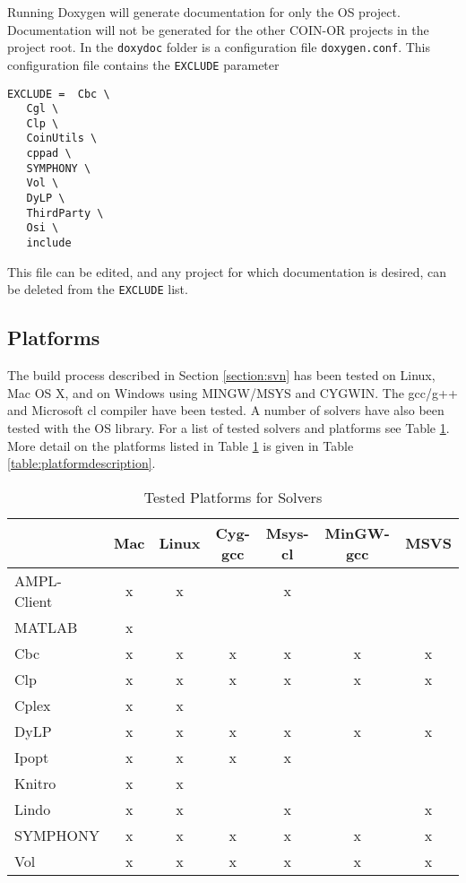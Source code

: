 \documentclass[11pt]{article}
\renewcommand{\_}{{\char"5F}}
\renewcommand{\{}{{\char"7B}}
\renewcommand{\}}{{\char"7D}}
\renewcommand{\^}{{\char"0D}}
\renewcommand{\'}{{\char"0D}}
\begin{document}
Running Doxygen will generate documentation for only the  OS project.  Documentation will not be generated for the other COIN-OR projects in the project root. In the {\tt doxydoc}  folder is a configuration file {\tt doxygen.conf}.  This configuration file contains the {\tt EXCLUDE} parameter

\begin{verbatim}
EXCLUDE =  Cbc \
   Cgl \
   Clp \
   CoinUtils \
   cppad \
   SYMPHONY \
   Vol \
   DyLP \
   ThirdParty \
   Osi \
   include
\end{verbatim}

This file can be edited, and any project for which documentation is desired, can be deleted from the {\tt EXCLUDE} list.






\subsection{Platforms}

The build process described in Section \ref{section:svn} has been tested on Linux, Mac OS X, and on Windows using  MINGW/MSYS and CYGWIN. The  gcc/g++ and Microsoft  cl compiler have been tested. A number of solvers have also been tested with the OS library. For a list of tested solvers and platforms see Table \ref{table:testedplatforms}.  More detail on the platforms listed in Table  \ref{table:testedplatforms} is given in Table \ref{table:platformdescription}.


\begin{table}
\caption{Tested Platforms for Solvers}
\centering
\label{table:testedplatforms}
\vskip 8pt
 \begin{tabular}{l|c|c|c|c|c|c|}
 &Mac&Linux&Cyg-gcc&Msys-cl&MinGW-gcc&MSVS \\ \hline
AMPL-Client &x&x&&x&& \\ \hline
MATLAB &x&&&&& \\ \hline
Cbc &x&x&x&x&x&x \\ \hline
Clp &x&x&x&x&x&x \\ \hline
Cplex &x&x&&&& \\ \hline
DyLP &x&x&x&x&x&x \\ \hline
Ipopt &x&x&x&x&& \\ \hline
Knitro &x&x&&&& \\ \hline
Lindo &x&x&&x&&x \\ \hline
SYMPHONY &x&x&x&x&x&x \\ \hline
Vol &x&x&x&x&x&x \\ \hline
\end{tabular}
\end{table}
\end{document}
